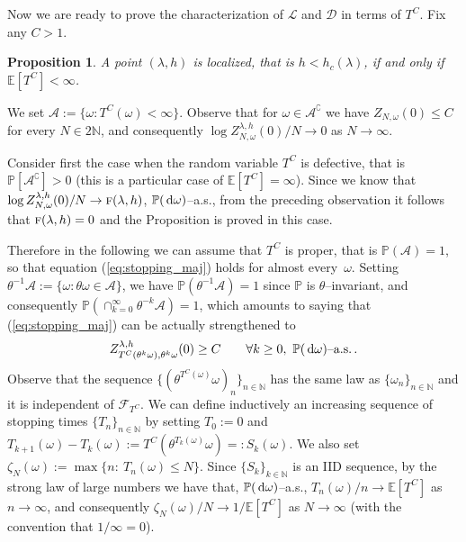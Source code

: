 \documentclass[reqno,11pt]{amsart}
\numberwithin{equation}{section}
\newtheorem{proposition}[theorem]{Proposition}
\newcommand{\N}{\mathbb{N}}
\newcommand{\cA}{{\ensuremath{\mathcal A}} }
\newcommand{\cF}{{\ensuremath{\mathcal F}} }
\newcommand{\cL}{{\ensuremath{\mathcal L}} }
\newcommand{\cD}{{\ensuremath{\mathcal D}} }
\newcommand{\dd}{\,\text{\rm d}}             %
\newcommand{\bbE}{{\ensuremath{\mathbb E}} }
\newcommand{\bbP}{{\ensuremath{\mathbb P}} }
\newcommand{\go}{\omega}
\newcommand{\gl}{\lambda}
\newcommand{\tf}{\textsc{f}}
\begin{document}
\bigskip

Now we are ready to prove the characterization of $\cL$ and $\cD$ in terms of $T^C$.
Fix any $C>1$.

\smallskip

\begin{proposition} \label{prop:stopping1}
A point $(\gl,h)$ is localized, that is $h < h_c(\gl)$, if and only if $\bbE[T^C]<\infty$.
\end{proposition}

\proof
We set $\cA:=\{\go: T^C(\go)<\infty\}$. Observe that for $\go\in \cA^{\complement}$ we have $Z_{N,\go}(0) \le C$ for every $N\in2\N$, and consequently $\log Z_{N,\go}^{\gl,h}(0)/N \to 0$ as $N\to\infty$.

Consider first the case when the random variable $T^C$ is defective, that is $\bbP[\cA^{\complement}]>0$ (this is a particular case of $\bbE[T^C]=\infty$). Since we know that $\log Z_{N,\go}^{\gl,h}(0)/N \to \tf(\gl,h)$, $\bbP(\dd\go)$--a.s., from the preceding observation it follows that $\tf(\gl,h)=0$ and the Proposition is proved in this case.

\smallskip

Therefore in the following we can assume that $T^C$ is proper, that is $\bbP(\cA)=1$, so that equation (\ref{eq:stopping_maj}) holds for almost every~$\go$. Setting $\theta^{-1}\cA := \{\go : \theta\go \in \cA\}$, we have $\bbP\left(\theta^{-1}\cA\right)=1$ since $\bbP$ is $\theta$--invariant, and consequently $\bbP\left(\cap_{k=0}^\infty \theta^{-k}\cA
 \right)=1$, which amounts to saying that (\ref{eq:stopping_maj}) can be actually strengthened to
\begin{equation} \label{eq:im_stopping_maj}
Z_{T^C(\theta^k\go),\theta^k\go}^{\gl,h}(0) \ge C \qquad \forall k \ge 0,\ \bbP(\dd\go)\text{--a.s.}\,.
\end{equation}
Observe that the sequence $\{( \theta^{T^C(\go)} \go )_n\}_{n\in\N}$ has the same law as $\{\go_n\}_{n\in\N}$ and it is independent of $\cF_{T^C}$. We can define inductively an increasing sequence of stopping times $\{T_n\}_{n\in\N}$ by setting $T_0:=0$ and $T_{k+1}(\go) - T_k(\go) := T^C(\theta^{T_k(\go)}\go) =: S_k(\go)$. We also set $\zeta_N(\go) := \max \{n:\ T_n(\go) \le N\}$. Since $\{S_k\}_{k\in\N}$ is an IID sequence, by the strong law of large numbers we have that, $\bbP(\dd\go)$--a.s., $T_n(\go)/n \to \bbE[T^C]$ as $n\to\infty$, and consequently $\zeta_N(\go)/N \to 1/\bbE[T^C]$ as $N\to\infty$ (with the convention that $1/\infty=0$).
\end{document}
